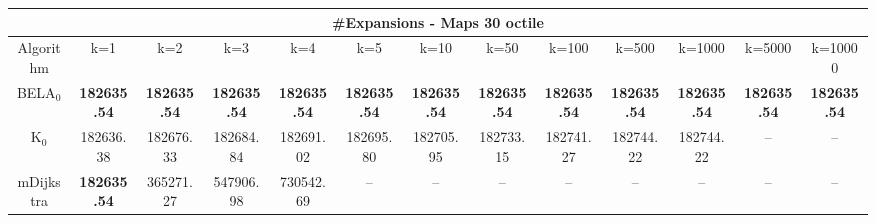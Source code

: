\begin{tabular}{c|cccccccccccc}\toprule
\multicolumn{13}{c}{#Expansions - Maps 30 octile}\\ \midrule
Algorithm & k=1 & k=2 & k=3 & k=4 & k=5 & k=10 & k=50 & k=100 & k=500 & k=1000 & k=5000 & k=10000 \\ \midrule
BELA$_0$ & \textbf{182635.54} & \textbf{182635.54} & \textbf{182635.54} & \textbf{182635.54} & \textbf{182635.54} & \textbf{182635.54} & \textbf{182635.54} & \textbf{182635.54} & \textbf{182635.54} & \textbf{182635.54} & \textbf{182635.54} & \textbf{182635.54} \\
K$_0$ & 182636.38 & 182676.33 & 182684.84 & 182691.02 & 182695.80 & 182705.95 & 182733.15 & 182741.27 & 182744.22 & 182744.22 & -- & -- \\
mDijkstra & \textbf{182635.54} & 365271.27 & 547906.98 & 730542.69 & -- & -- & -- & -- & -- & -- & -- & -- \\ \bottomrule 
\end{tabular}
